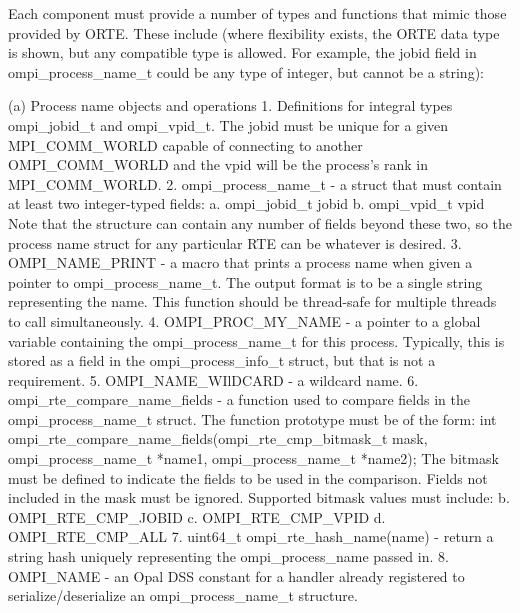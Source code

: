  Each component must provide a number of types and functions that mimic
 those provided by ORTE. These include (where flexibility exists, the
 ORTE data type is shown, but any compatible type is allowed. For example,
 the jobid field in ompi_process_name_t could be any type of integer, but
 cannot be a string):

 (a) Process name objects and operations
     1. Definitions for integral types ompi_jobid_t and ompi_vpid_t.
        The jobid must be unique for a given MPI_COMM_WORLD capable of
        connecting to another OMPI_COMM_WORLD and the vpid will be the
        process's rank in MPI_COMM_WORLD.
     2. ompi_process_name_t - a struct that must contain at least two integer-typed fields:
           a. ompi_jobid_t jobid
           b. ompi_vpid_t vpid
        Note that the structure can contain any number of fields beyond these
        two, so the process name struct for any particular RTE can be whatever
        is desired.
     3. OMPI_NAME_PRINT - a macro that prints a process name when given
        a pointer to ompi_process_name_t. The output format is to be
        a single string representing the name.  This function should
        be thread-safe for multiple threads to call simultaneously.
     4. OMPI_PROC_MY_NAME - a pointer to a global variable containing
        the ompi_process_name_t for this process. Typically, this is
        stored as a field in the ompi_process_info_t struct, but that
        is not a requirement.
     5. OMPI_NAME_WIlDCARD - a wildcard name.
     6. ompi_rte_compare_name_fields - a function used to compare fields
        in the ompi_process_name_t struct. The function prototype must be
        of the form:
        int ompi_rte_compare_name_fields(ompi_rte_cmp_bitmask_t mask,
                                         ompi_process_name_t *name1,
                                         ompi_process_name_t *name2);
        The bitmask must be defined to indicate the fields to be used
        in the comparison. Fields not included in the mask must be ignored.
        Supported bitmask values must include:
           b. OMPI_RTE_CMP_JOBID
           c. OMPI_RTE_CMP_VPID
           d. OMPI_RTE_CMP_ALL
      7. uint64_t ompi_rte_hash_name(name) - return a string hash uniquely
         representing the ompi_process_name passed in.
      8. OMPI_NAME - an Opal DSS constant for a handler already registered
         to serialize/deserialize an ompi_process_name_t structure.

